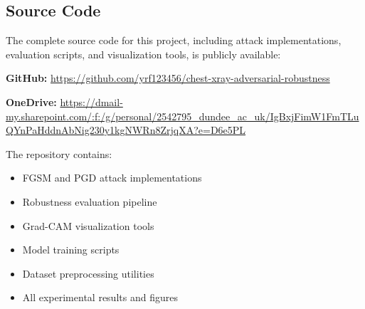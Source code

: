 \documentclass[12pt,a4paper]{article}
\begin{document}
\begin{appendices}
    \section{Source Code}
    \label{app:code}
    
    The complete source code for this project, including attack implementations, evaluation scripts, and visualization tools, is publicly available:
    
    \textbf{GitHub:} \url{https://github.com/yrf123456/chest-xray-adversarial-robustness}
    
    \textbf{OneDrive:} \url{https://dmail-my.sharepoint.com/:f:/g/personal/2542795_dundee_ac_uk/IgBxjFimW1FmTLuQYnPaHddnAbNig230y1kgNWRn8ZrjqXA?e=D6e5PL}
    
    The repository contains:
    \begin{itemize}
        \item FGSM and PGD attack implementations
        \item Robustness evaluation pipeline
        \item Grad-CAM visualization tools
        \item Model training scripts
        \item Dataset preprocessing utilities
        \item All experimental results and figures
    \end{itemize}
    
\end{appendices}
\end{document}
